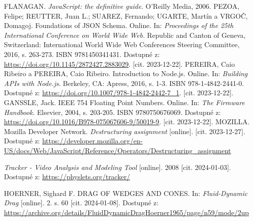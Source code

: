 \documentclass[12pt, a4paper,
 twoside,        %
 openright
]{report}
\begin{document}
\begin{thebibliography}{99}
     FLANAGAN. \textit{JavaScript: the definitive guide.} O'Reilly Media, 2006.
     PEZOA, Felipe; REUTTER, Juan L.; SUAREZ, Fernando; UGARTE, Martín a VRGOČ, Domagoj. Foundations of JSON Schema. Online. In: \textit{Proceedings of the 25th International Conference on World Wide Web.} Republic and Canton of Geneva, Switzerland: International World Wide Web Conferences Steering Committee, 2016, s. 263-273. ISBN 9781450341431. Dostupné z: \url{https://doi.org/10.1145/2872427.2883029}. [cit. 2023-12-22].
     PEREIRA, Caio Ribeiro a PEREIRA, Caio Ribeiro. Introduction to Node.js. Online. In: \textit{Building APIs with Node.js}. Berkeley, CA: Apress, 2016, s. 1-3. ISBN 978-1-4842-2441-0. Dostupné z: \url{https://doi.org/10.1007/978-1-4842-2442-7_1}. [cit. 2023-12-22].
    GANSSLE, Jack. IEEE 754 Floating Point Numbers. Online. In: \textit{The Firmware Handbook.} Elsevier, 2004, s. 203-205. ISBN 9780750676069. Dostupné z: \url{https://doi.org/10.1016/B978-075067606-9/50019-9}. [cit. 2023-12-22].
     MOZILLA. Mozilla Developer Network. \textit{Destructuring assignment} [online]. [cit. 2023-12-27]. Dostupné z: \url{https://developer.mozilla.org/en-US/docs/Web/JavaScript/Reference/Operators/Destructuring_assignment}

     \textit{Tracker - Video Analysis and Modeling Tool} [online]. 2008 [cit. 2024-01-03]. Dostupné z: \url{https://physlets.org/tracker/}

     HOERNER, Sighard F. DRAG OF WEDGES AND CONES. In: \textit{Fluid-Dynamic Drag} [online]. 2. s. 60 [cit. 2024-01-08]. Dostupné z: \url{https://archive.org/details/FluidDynamicDragHoerner1965/page/n59/mode/2up}


\end{thebibliography}
\end{document}
